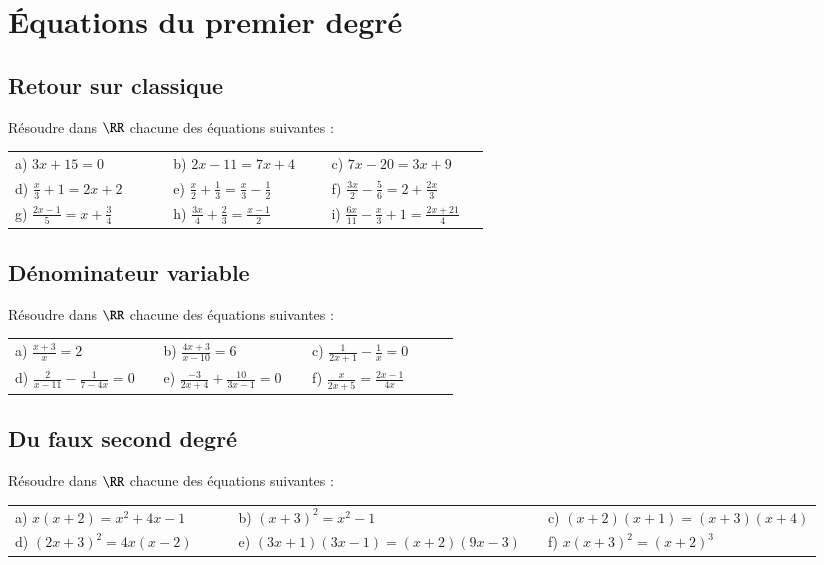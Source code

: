 \documentclass[oneside,12pt]{article}          %
\begin{document}
\section{Équations du premier degré}

\subsection{Retour sur classique}
Résoudre dans $\RR$ chacune des équations suivantes :

\renewcommand{\arraystretch}{1.5}
\begin{tabular}{p{0.3\linewidth} p{0.3\linewidth} p{0.3\linewidth}}
	a) $3x+15=0$ & b) $2x-11=7x+4$ & c) $7x-20=3x+9$ \\
	d) $\frac{x}{3}+1=2x+2$ & e) $\frac{x}{2}+\frac{1}{3}=\frac{x}{3}-\frac{1}{2}$ & f) $\frac{3x}{2}-\frac{5}{6}=2+\frac{2x}{3}$ \\
g) $\frac{2x-1}{5}=x+\frac{3}{4}$ & h) $\frac{3x}{4}+\frac{2}{3}=\frac{x-1}{2}$ & i) $\frac{6x}{11}-\frac{x}{3}+1=\frac{2x+21}{4}$
\end{tabular}



\subsection{Dénominateur variable}
Résoudre dans $\RR$ chacune des équations suivantes :

\begin{tabular}{p{0.3\linewidth} p{0.3\linewidth} p{0.3\linewidth}}
	a) $\frac{x+3}{x}=2$ & b) $\frac{4x+3}{x-10}=6$ & c) $\frac{1}{2x+1}-\frac{1}{x}=0$ \\
	d) $\frac{2}{x-11}-\frac{1}{7-4x}=0$ & e) $\frac{-3}{2x+4}+\frac{10}{3x-1}=0$ & f) $\frac{x}{2x+5}=\frac{2x-1}{4x}$
\end{tabular}



\subsection{Du faux second degré}
Résoudre dans $\RR$ chacune des équations suivantes :

\begin{tabular}{p{0.26\linewidth} p{0.36\linewidth} p{0.32\linewidth}}
	a) $x(x+2)=x^2+4x-1$ & b) $(x+3)^2=x^2-1$ & c) $(x+2)(x+1)=(x+3)(x+4)$ \\
	d) $(2x+3)^2=4x(x-2)$ & e) $(3x+1)(3x-1)=(x+2)(9x-3)$ & f) $x(x+3)^2=(x+2)^3$
\end{tabular}
\end{document}
